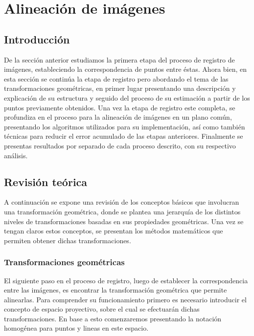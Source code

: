 \chapter{Alineación de imágenes}
\label{capitulo4}

\section{Introducción}

De la sección anterior estudiamos la primera etapa del proceso de registro de imágenes, estableciendo la correspondencia de puntos entre éstas. Ahora bien, en esta sección se continúa la etapa de registro pero abordando el tema de las transformaciones geométricas, en primer lugar presentando una descripción y explicación de su estructura y seguido del proceso de su estimación a partir de los puntos previamente obtenidos. Una vez la etapa de registro este completa, se profundiza en el proceso para la alineación de imágenes en un plano común, presentando los algoritmos utilizados para su implementación, así como también técnicas para reducir el error acumulado de las etapas anteriores. Finalmente se presentas resultados por separado de cada proceso descrito, con su respectivo análisis.

\section{Revisión teórica}

A continuación se expone una revisión de los conceptos básicos que involucran una transformación geométrica, donde se plantea una jerarquía de los distintos niveles de transformaciones basadas en sus propiedades geométricas. Una vez se tengan claros estos conceptos, se presentan los métodos matemáticos que permiten obtener dichas transformaciones. 

\subsection{Transformaciones geométricas}

El siguiente paso en el proceso de registro, luego de establecer la correspondencia entre las imágenes, es encontrar la transformación geométrica que permite alinearlas. Para comprender su funcionamiento primero es necesario introducir el concepto de espacio proyectivo, sobre el cual se efectuarán dichas transformaciones. En base a esto comenzaremos presentando la notación homogénea para puntos y lineas en este espacio.

